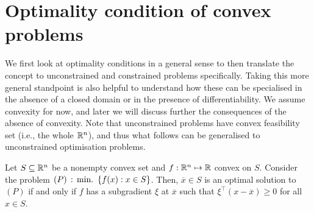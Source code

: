 \section{Optimality condition of convex problems}


We first look at optimality conditions in a general sense to then translate the concept to unconstrained and constrained problems specifically. Taking this more general standpoint is also helpful to understand how these can be specialised in the absence of a closed domain or in the presence of differentiability. We assume convexity for now, and later we will discuss further the consequences of the absence of convexity. Note that unconstrained problems have convex feasibility set (i.e., the whole $\mathbb{R}^n$), and thus what follows can be generalised to unconstrained optimisation problems.
%
\begin{theorem} \label{thm:opt_conditions}
Let $S \subseteq \mathbb{R}^n$ be a nonempty convex set and $f:\mathbb{R}^n \mapsto \mathbb{R}$ convex on $S$. Consider the problem $(P) \,:\, \mathop{\text{min.~}}\left\{ f(x) : x \in S \right \}$.\hspace{-2pt} Then, $\overline{x}\in S$ is an optimal solution to $(P)$ if and only if $f$ has a subgradient $\xi$ at $\overline{x}$ such that $\xi^\top(x - \overline{x}) \geq 0$ for all $x \in S$. 
\end{theorem}  

